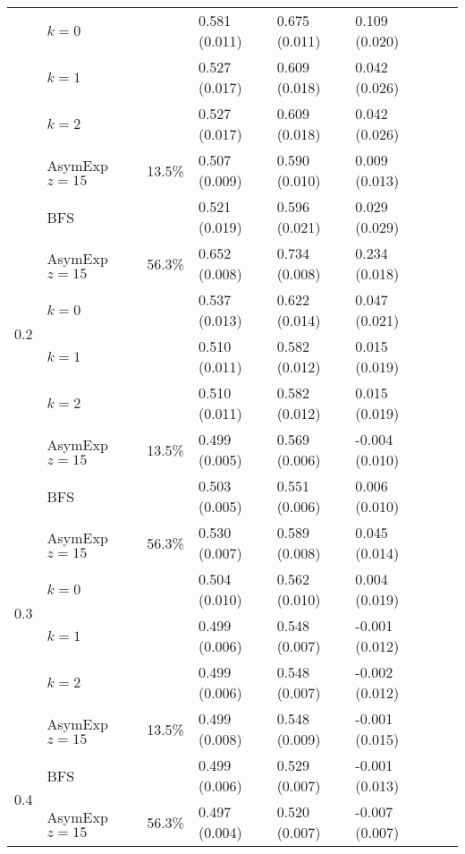 \documentclass[a4paper,final,notitlepage,11pt,svgnames]{scrartcl}
\begin{document}
\begin{table}[htpb]
\begin{tabular}{llllllll}
		& $k=0$          &              & 0.581 (0.011) & 0.675 (0.011) & 0.109 (0.020)  &               & \\
		& $k=1$          &              & 0.527 (0.017) & 0.609 (0.018) & 0.042 (0.026)  &               & \\
		& $k=2$          &              & 0.527 (0.017) & 0.609 (0.018) & 0.042 (0.026)  &               & \\
		& AsymExp $z=15$ & 13.5\%       & 0.507 (0.009) & 0.590 (0.010) & 0.009 (0.013)  &               & \\
		\cmidrule(r){2-6}
		\multirow{6}{*}{0.2}      & BFS            &              & 0.521 (0.019) & 0.596 (0.021) & 0.029 (0.029)  &               & \\
		& AsymExp $z=15$ & 56.3\%       & 0.652 (0.008) & 0.734 (0.008) & 0.234 (0.018)  &               & \\
		& $k=0$          &              & 0.537 (0.013) & 0.622 (0.014) & 0.047 (0.021)  &               & \\
		& $k=1$          &              & 0.510 (0.011) & 0.582 (0.012) & 0.015 (0.019)  &               & \\
		& $k=2$          &              & 0.510 (0.011) & 0.582 (0.012) & 0.015 (0.019)  &               & \\
		& AsymExp $z=15$ & 13.5\%       & 0.499 (0.005) & 0.569 (0.006) & -0.004 (0.010) &               & \\
		\cmidrule(r){2-6}
		\multirow{6}{*}{0.3}      & BFS            &              & 0.503 (0.005) & 0.551 (0.006) & 0.006 (0.010)  &               & \\
		& AsymExp $z=15$ & 56.3\%       & 0.530 (0.007) & 0.589 (0.008) & 0.045 (0.014)  &               & \\
		& $k=0$          &              & 0.504 (0.010) & 0.562 (0.010) & 0.004 (0.019)  &               & \\
		& $k=1$          &              & 0.499 (0.006) & 0.548 (0.007) & -0.001 (0.012) &               & \\
		& $k=2$          &              & 0.499 (0.006) & 0.548 (0.007) & -0.002 (0.012) &               & \\
		& AsymExp $z=15$ & 13.5\%       & 0.499 (0.008) & 0.548 (0.009) & -0.001 (0.015) &               & \\
		\cmidrule(r){2-6}
		\multirow{6}{*}{0.4}      & BFS            &              & 0.499 (0.006) & 0.529 (0.007) & -0.001 (0.013) &               & \\
		& AsymExp $z=15$ & 56.3\%       & 0.497 (0.004) & 0.520 (0.007) & -0.007 (0.007) &               & \\

\end{tabular}
\end{table}
\end{document}
